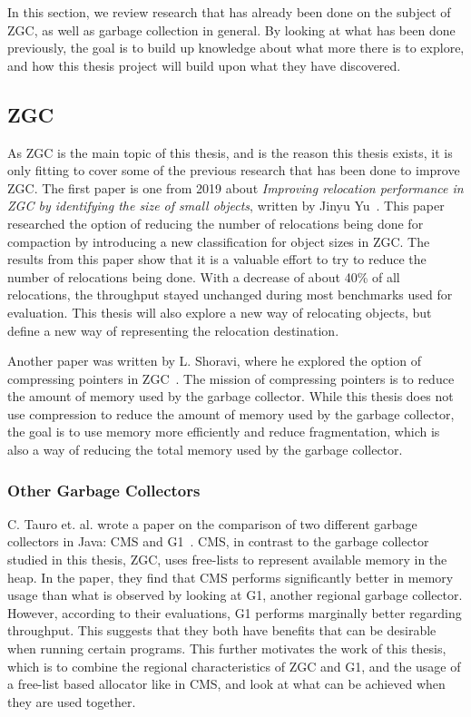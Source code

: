 

In this section, we review research that has already been done on the subject of ZGC, as well as garbage collection in general. By looking at what has been done previously, the goal is to build up knowledge about what more there is to explore, and how this thesis project will build upon what they have discovered. 

\subsection{ZGC}
As ZGC is the main topic of this thesis, and is the reason this thesis exists, it is only fitting to cover some of the previous research that has been done to improve ZGC. The first paper is one from 2019 about \textit{Improving relocation performance in ZGC by identifying the size of small objects}, written by Jinyu Yu~\cite{zgc:yu}. This paper researched the option of reducing the number of relocations being done for compaction by introducing a new classification for object sizes in ZGC. The results from this paper show that it is a valuable effort to try to reduce the number of relocations being done. With a decrease of about 40\% of all relocations, the throughput stayed unchanged during most benchmarks used for evaluation. This thesis will also explore a new way of relocating objects, but define a new way of representing the relocation destination.

Another paper was written by L. Shoravi, where he explored the option of compressing pointers in ZGC~\cite{zgc:shoravi}. The mission of compressing pointers is to reduce the amount of memory used by the garbage collector. While this thesis does not use compression to reduce the amount of memory used by the garbage collector, the goal is to use memory more efficiently and reduce fragmentation, which is also a way of reducing the total memory used by the garbage collector.

\subsubsection{Other Garbage Collectors}
C. Tauro et. al. wrote a paper on the comparison of two different garbage collectors in Java: CMS and G1~\cite{gc:tauro}. CMS, in contrast to the garbage collector studied in this thesis, ZGC, uses free-lists to represent available memory in the heap. In the paper, they find that CMS performs significantly better in memory usage than what is observed by looking at G1, another regional garbage collector. However, according to their evaluations, G1 performs marginally better regarding throughput. This suggests that they both have benefits that can be desirable when running certain programs. This further motivates the work of this thesis, which is to combine the regional characteristics of ZGC and G1, and the usage of a free-list based allocator like in CMS, and look at what can be achieved when they are used together.